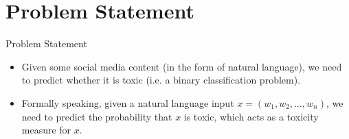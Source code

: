 \section{Problem Statement}

\begin{frame}{Problem Statement}

    \begin{itemize}
        \item Given some social media content (in the form of natural language), we need to predict whether it is toxic (i.e. a binary classification problem).
        \item Formally speaking, given a natural language input $x = (w_1, w_2, \dots, w_n)$, we need to predict the probability that $x$ is toxic, which acts as a toxicity measure for $x$.
    \end{itemize}
    
\end{frame}

